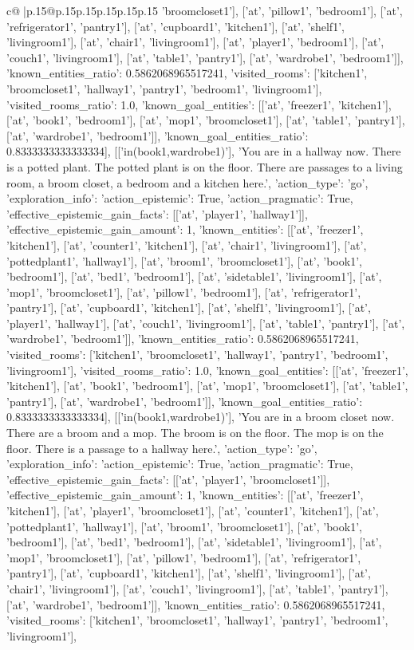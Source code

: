 \documentclass{article}
\begin{document}
{\begin{supertabular}{c@{$\;$}|p{.15\linewidth}@{}p{.15\linewidth}p{.15\linewidth}p{.15\linewidth}p{.15\linewidth}p{.15\linewidth}}
{{{'broomcloset1'], ['at', 'pillow1', 'bedroom1'], ['at', 'refrigerator1', 'pantry1'], ['at', 'cupboard1', 'kitchen1'], ['at', 'shelf1', 'livingroom1'], ['at', 'chair1', 'livingroom1'], ['at', 'player1', 'bedroom1'], ['at', 'couch1', 'livingroom1'], ['at', 'table1', 'pantry1'], ['at', 'wardrobe1', 'bedroom1']], 'known_entities_ratio': 0.5862068965517241, 'visited_rooms': ['kitchen1', 'broomcloset1', 'hallway1', 'pantry1', 'bedroom1', 'livingroom1'], 'visited_rooms_ratio': 1.0, 'known_goal_entities': [['at', 'freezer1', 'kitchen1'], ['at', 'book1', 'bedroom1'], ['at', 'mop1', 'broomcloset1'], ['at', 'table1', 'pantry1'], ['at', 'wardrobe1', 'bedroom1']], 'known_goal_entities_ratio': 0.8333333333333334}}], [['in(book1,wardrobe1)'], 'You are in a hallway now. There is a potted plant. The potted plant is on the floor. There are passages to a living room, a broom closet, a bedroom and a kitchen here.', {'action_type': 'go', 'exploration_info': {'action_epistemic': True, 'action_pragmatic': True, 'effective_epistemic_gain_facts': [['at', 'player1', 'hallway1']], 'effective_epistemic_gain_amount': 1, 'known_entities': [['at', 'freezer1', 'kitchen1'], ['at', 'counter1', 'kitchen1'], ['at', 'chair1', 'livingroom1'], ['at', 'pottedplant1', 'hallway1'], ['at', 'broom1', 'broomcloset1'], ['at', 'book1', 'bedroom1'], ['at', 'bed1', 'bedroom1'], ['at', 'sidetable1', 'livingroom1'], ['at', 'mop1', 'broomcloset1'], ['at', 'pillow1', 'bedroom1'], ['at', 'refrigerator1', 'pantry1'], ['at', 'cupboard1', 'kitchen1'], ['at', 'shelf1', 'livingroom1'], ['at', 'player1', 'hallway1'], ['at', 'couch1', 'livingroom1'], ['at', 'table1', 'pantry1'], ['at', 'wardrobe1', 'bedroom1']], 'known_entities_ratio': 0.5862068965517241, 'visited_rooms': ['kitchen1', 'broomcloset1', 'hallway1', 'pantry1', 'bedroom1', 'livingroom1'], 'visited_rooms_ratio': 1.0, 'known_goal_entities': [['at', 'freezer1', 'kitchen1'], ['at', 'book1', 'bedroom1'], ['at', 'mop1', 'broomcloset1'], ['at', 'table1', 'pantry1'], ['at', 'wardrobe1', 'bedroom1']], 'known_goal_entities_ratio': 0.8333333333333334}}], [['in(book1,wardrobe1)'], 'You are in a broom closet now. There are a broom and a mop. The broom is on the floor. The mop is on the floor. There is a passage to a hallway here.', {'action_type': 'go', 'exploration_info': {'action_epistemic': True, 'action_pragmatic': True, 'effective_epistemic_gain_facts': [['at', 'player1', 'broomcloset1']], 'effective_epistemic_gain_amount': 1, 'known_entities': [['at', 'freezer1', 'kitchen1'], ['at', 'player1', 'broomcloset1'], ['at', 'counter1', 'kitchen1'], ['at', 'pottedplant1', 'hallway1'], ['at', 'broom1', 'broomcloset1'], ['at', 'book1', 'bedroom1'], ['at', 'bed1', 'bedroom1'], ['at', 'sidetable1', 'livingroom1'], ['at', 'mop1', 'broomcloset1'], ['at', 'pillow1', 'bedroom1'], ['at', 'refrigerator1', 'pantry1'], ['at', 'cupboard1', 'kitchen1'], ['at', 'shelf1', 'livingroom1'], ['at', 'chair1', 'livingroom1'], ['at', 'couch1', 'livingroom1'], ['at', 'table1', 'pantry1'], ['at', 'wardrobe1', 'bedroom1']], 'known_entities_ratio': 0.5862068965517241, 'visited_rooms': ['kitchen1', 'broomcloset1', 'hallway1', 'pantry1', 'bedroom1', 'livingroom1'], }}}
\end{supertabular}}
\end{document}
